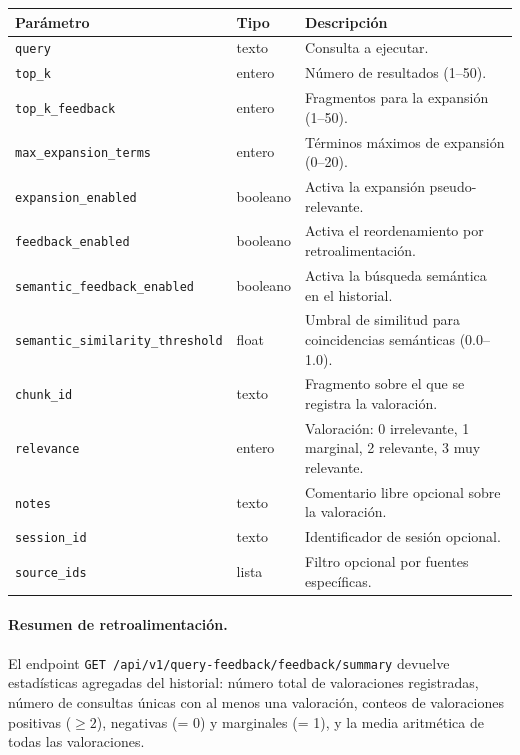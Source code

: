 \documentclass[11pt]{article}
\begin{document}
\begin{center}
\begin{tabular}{lll}
\toprule
\textbf{Parámetro} & \textbf{Tipo} & \textbf{Descripción} \\
\midrule
\texttt{query}                        & texto    & Consulta a ejecutar. \\
\texttt{top\_k}                       & entero   & Número de resultados (1--50). \\
\texttt{top\_k\_feedback}             & entero   & Fragmentos para la expansión (1--50). \\
\texttt{max\_expansion\_terms}        & entero   & Términos máximos de expansión (0--20). \\
\texttt{expansion\_enabled}           & booleano & Activa la expansión pseudo-relevante. \\
\texttt{feedback\_enabled}            & booleano & Activa el reordenamiento por retroalimentación. \\
\texttt{semantic\_feedback\_enabled}  & booleano & Activa la búsqueda semántica en el historial. \\
\texttt{semantic\_similarity\_threshold} & float & Umbral de similitud para coincidencias semánticas (0.0--1.0). \\
\texttt{chunk\_id}                    & texto    & Fragmento sobre el que se registra la valoración. \\
\texttt{relevance}                    & entero   & Valoración: 0 irrelevante, 1 marginal, 2 relevante,
                                                   3 muy relevante. \\
\texttt{notes}                        & texto    & Comentario libre opcional sobre la valoración. \\
\texttt{session\_id}                  & texto    & Identificador de sesión opcional. \\
\texttt{source\_ids}                  & lista    & Filtro opcional por fuentes específicas. \\
\bottomrule
\end{tabular}
\end{center}

\paragraph{Resumen de retroalimentación.}
El endpoint \texttt{GET /api/v1/query-feedback/feedback/summary} devuelve estadísticas
agregadas del historial: número total de valoraciones registradas, número de consultas únicas
con al menos una valoración, conteos de valoraciones positivas ($\geq 2$), negativas (= 0) y
marginales (= 1), y la media aritmética de todas las valoraciones.
\end{document}
